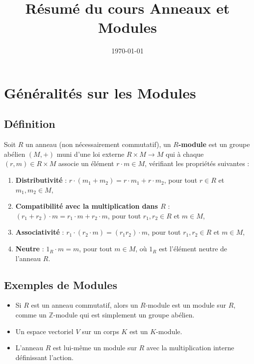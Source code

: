 \documentclass[12pt]{book}
\title{Résumé du cours Anneaux et Modules}
\date{\today}
\begin{document}

\maketitle
\tableofcontents 
\newpage

\section{ Généralités sur les Modules}

\subsection*{Définition}
Soit \( R \) un anneau (non nécessairement commutatif), un \textbf{\( R \)-module} est un groupe abélien \( (M, +) \) muni d'une loi externe \( R \times M \to M \) qui à chaque \( (r, m) \in R \times M \) associe un élément \( r \cdot m \in M \), vérifiant les propriétés suivantes :
\begin{enumerate}
    \item \textbf{Distributivité} : \( r \cdot (m_1 + m_2) = r \cdot m_1 + r \cdot m_2 \), pour tout \( r \in R \) et \( m_1, m_2 \in M \),
    \item \textbf{Compatibilité avec la multiplication dans \( R \)} : \( (r_1 + r_2) \cdot m = r_1 \cdot m + r_2 \cdot m \), pour tout \( r_1, r_2 \in R \) et \( m \in M \),
    \item \textbf{Associativité} : \( r_1 \cdot (r_2 \cdot m) = (r_1 r_2) \cdot m \), pour tout \( r_1, r_2 \in R \) et \( m \in M \),
    \item \textbf{Neutre} : \( 1_R \cdot m = m \), pour tout \( m \in M \), où \( 1_R \) est l'élément neutre de l'anneau \( R \).
\end{enumerate}

\subsection*{Exemples de Modules}
\begin{itemize}
    \item Si \( R \) est un anneau commutatif, alors un \( R \)-module est un module sur \( R \), comme un \( \mathbb{Z} \)-module qui est simplement un groupe abélien.
    \item Un espace vectoriel \( V \) sur un corps \( K \) est un \( K \)-module.
    \item L'anneau \( R \) est lui-même un module sur \( R \) avec la multiplication interne définissant l'action.
\end{itemize}
\end{document}

